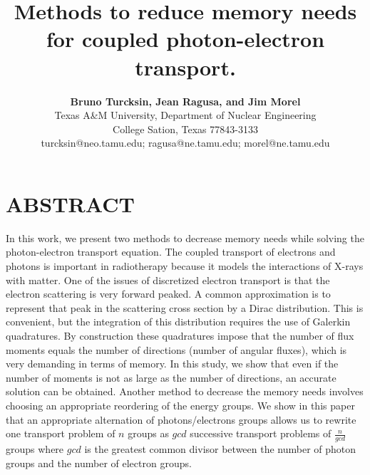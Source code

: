 \documentclass[11pt,letter,twoside]{mc2011}
\begin{document}
\title{Methods to reduce memory needs for coupled photon-electron transport.}

\author{
    \textbf{Bruno Turcksin, Jean Ragusa, and Jim Morel}\\
    Texas A\&M University, Department of Nuclear Engineering\\
    College Sation, Texas 77843-3133\\
    turcksin@neo.tamu.edu; ragusa@ne.tamu.edu; morel@ne.tamu.edu
}

\maketitle

\thispagestyle{empty}

\section*{ABSTRACT}

\small
In this work, we present two methods to decrease memory needs while solving 
the photon-electron transport equation. The coupled transport of electrons and
photons is important in radiotherapy because it models the interactions of
X-rays with matter. One of the issues of discretized electron transport is that the
electron scattering is very forward peaked. A common approximation is to
represent that peak in the scattering cross section by a Dirac distribution.
This is convenient, but the integration of this distribution requires the
use of Galerkin quadratures. By construction these quadratures impose that
the number of flux moments equals the number of directions 
(number of angular fluxes), which is very demanding in terms of memory. In this study, 
we show that even if the number of moments is not as large as the number 
of directions, an accurate solution can be obtained. Another method to decrease the 
memory needs involves choosing an appropriate reordering of the energy
groups. 
We show in this paper that an appropriate alternation of photons/electrons groups 
allows us to rewrite one transport problem of $n$ groups as $gcd$ successive 
transport problems of $\frac{n}{gcd}$ groups where $gcd$ is the greatest common 
divisor between the number of photon groups and the number of electron groups.


\end{document}
